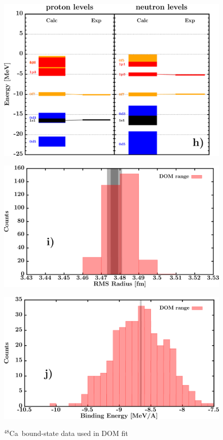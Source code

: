\documentclass[twocolumn,secnumarabic,amssymb, nobibnotes, aps, prl,
superscriptaddress, nobalancelastpage]{revtex4}
\newcommand{\caEight}{\ensuremath{^{48}}C\lowercase{a}}
\begin{document}
\begin{figure}[!htb]
\begin{minipage}{0.4\linewidth}
        \label{DOM_ca48_chargeDensity}
    \end{minipage}
    \begin{minipage}{0.35\linewidth}
        \centering
        \includegraphics[width=\linewidth]{figures/ca48_SPLevels.png}
        \label{DOM_ca48_SPLevels}
    \end{minipage}
    \begin{minipage}{0.4\linewidth}
        \centering
        \includegraphics[width=\linewidth]{figures/ca48_RMSRadius.png}
        \label{DOM_ca48_RMSRadius}
    \end{minipage}
    \begin{minipage}{0.4\linewidth}
        \centering
        \includegraphics[width=\linewidth]{figures/ca48_BE.png}
        \label{DOM_ca48_BE}
    \end{minipage}
    \caption{\caEight\ bound-state data used in DOM fit}
    \label{DOM_ca48_structural}
\end{figure}
\end{document}
